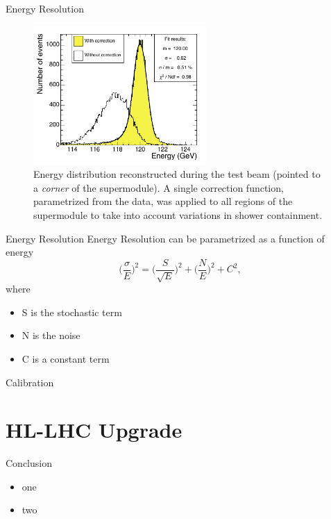 \documentclass[10pt]{beamer}
\begin{document}
\begin{frame}{Energy Resolution}
    \begin{figure}
        \centering
        \includegraphics[height=150pt]{./img/resolution_2.png}
        \caption{Energy distribution reconstructed during the test beam (pointed to a \emph{corner} of the supermodule). A single correction function, parametrized from the data, was applied to all regions of the supermodule to take into account variations in shower containment.}
        \label{fig:res2}
    \end{figure}{}
\end{frame}

\begin{frame}{Energy Resolution}
    Energy Resolution can be parametrized as a function of energy
    \begin{equation}
        \biggl(\frac{\sigma}{E}\biggr)^2 = \biggl(\frac{S}{\sqrt{E}}\biggr)^2 + \biggl(\frac{N}{E}\biggr)^2 + C^2 ,
    \end{equation}
    where 
    \begin{itemize}
        \item S is the stochastic term
        \item N is the noise
        \item C is a constant term
    \end{itemize}
    
\end{frame}

\begin{frame}{Calibration}
    
\end{frame}


\section{HL-LHC Upgrade}


\begin{frame}{Conclusion}
    \begin{itemize}
        \item one
        \item two
    \end{itemize}
\end{frame}
 
\end{document}

